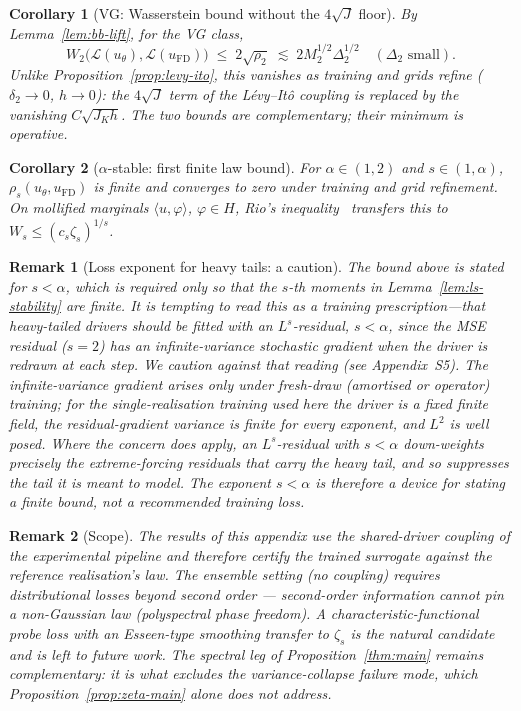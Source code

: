 \documentclass[review,12pt]{elsarticle}
\newtheorem{remark}{Remark}
\newtheorem{corollary}{Corollary}
\begin{document}
\begin{corollary}[VG: Wasserstein bound without the $4\sqrt J$
floor]\label{cor:vg-floorfree}
By Lemma~\ref{lem:bb-lift}, for the VG class,
\[
W_2\bigl(\mathcal L(u_\theta), \mathcal L(u_{\mathrm{FD}})\bigr)
\;\le\; 2\sqrt{\rho_2}
\;\lesssim\; 2 M_2^{1/2} \Delta_2^{1/2}
\quad (\Delta_2 \text{ small}).
\]
Unlike Proposition~\ref{prop:levy-ito}, this vanishes as training and
grids refine ($\delta_2 \to 0$, $h \to 0$): the $4\sqrt J$ term of
the L\'evy--It\^o coupling is replaced by the vanishing
$C\sqrt{J_K h}$. The two bounds are complementary; their minimum is
operative.
\end{corollary}

\begin{corollary}[$\alpha$-stable: first finite law bound]
\label{cor:stable}
For $\alpha \in (1, 2)$ and $s \in (1, \alpha)$,
$\rho_s(u_\theta, u_{\mathrm{FD}})$ is finite and converges to zero
under training and grid refinement. On mollified marginals
$\langle u, \varphi\rangle$, $\varphi \in H$, Rio's
inequality~\cite{Rio2009} transfers this to
$W_s \le (c_s \zeta_s)^{1/s}$.
\end{corollary}

\begin{remark}[Loss exponent for heavy tails: a caution]
\label{rem:loss-exponent}
The bound above is stated for $s < \alpha$, which is required only so
that the $s$-th moments in Lemma~\ref{lem:ls-stability} are finite. It
is tempting to read this as a training prescription---that heavy-tailed
drivers \emph{should} be fitted with an $L^s$-residual, $s < \alpha$,
since the MSE residual ($s = 2$) has an infinite-variance stochastic
gradient when the driver is redrawn at each step. We caution against
that reading (see Appendix~S5). The infinite-variance gradient arises
only under fresh-draw (amortised or operator) training; for the
single-realisation training used here the driver is a \emph{fixed
finite field}, the residual-gradient variance is finite for every
exponent, and $L^2$ is well posed. Where the concern does apply, an
$L^s$-residual with $s < \alpha$ down-weights precisely the
extreme-forcing residuals that carry the heavy tail, and so
\emph{suppresses} the tail it is meant to model. The exponent
$s < \alpha$ is therefore a device for stating a finite bound, not a
recommended training loss.
\end{remark}

\begin{remark}[Scope]\label{rem:zeta-scope}
The results of this appendix use the shared-driver coupling of the
experimental pipeline and therefore certify the trained surrogate
against the reference realisation's law. The ensemble setting (no
coupling) requires distributional losses beyond second order —
second-order information cannot pin a non-Gaussian law (polyspectral
phase freedom). A characteristic-functional probe loss with an
Esseen-type smoothing transfer to $\zeta_s$ is the natural candidate
and is left to future work. The spectral leg of
Proposition~\ref{thm:main} remains complementary: it is what excludes
the variance-collapse failure mode, which
Proposition~\ref{prop:zeta-main} alone does not address.
\end{remark}
\end{document}

